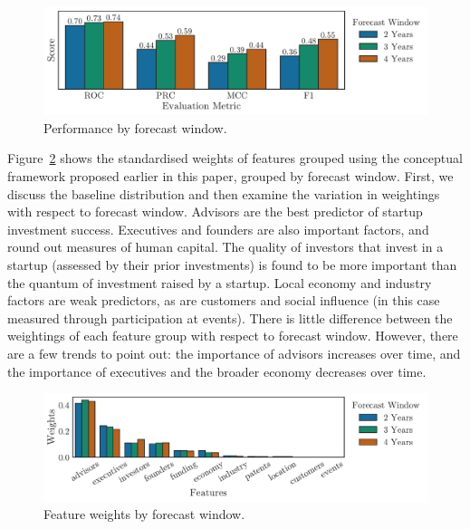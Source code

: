 \documentclass[../thesis/thesis.tex]{subfiles}
\begin{document}
\begin{figure}[!htb]
    \centering
    \includegraphics[width=\textwidth]{../figures/evaluation/performance_window}
    \caption[Performance by forecast window]{Performance by forecast window.}
    \label{fig:evaluation:performance_window}
\end{figure}

Figure~\ref{fig:evaluation:features_window} shows the standardised weights of features grouped using the conceptual framework proposed earlier in this paper, grouped by forecast window. First, we discuss the baseline distribution and then examine the variation in weightings with respect to forecast window. Advisors are the best predictor of startup investment success. Executives and founders are also important factors, and round out measures of human capital. The quality of investors that invest in a startup (assessed by their prior investments) is found to be more important than the quantum of investment raised by a startup. Local economy and industry factors are weak predictors, as are customers and social influence (in this case measured through participation at events). There is little difference between the weightings of each feature group with respect to forecast window. However, there are a few trends to point out: the importance of advisors increases over time, and the importance of executives and the broader economy decreases over time.

\begin{figure}[!htb]
    \centering
    \includegraphics[width=\textwidth]{../figures/evaluation/features_window}
    \caption[Feature weights by forecast window]{Feature weights by forecast window.}
    \label{fig:evaluation:features_window}
\end{figure}
\end{document}
